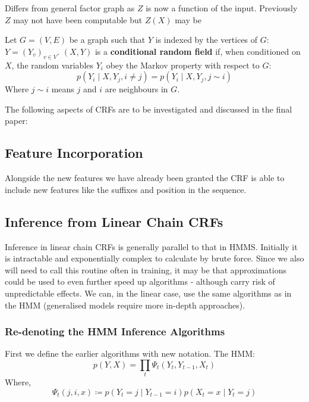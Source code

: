 \documentclass[../main.tex]{subfiles}
\begin{document}
Differs from general factor graph as $Z$ is now a function of the input. Previously $Z$ may not have been computable but $Z(X)$ may be

\begin{definition}
    Let $G = (V,E)$ be a graph such that $Y$ is indexed by the vertices of $G$: $Y = (Y_v)_{v \in V}$. $(X,Y)$ is a \textbf{conditional random field} if, when conditioned on $X$, the random variables $Y_i$ obey the Markov property with respect to $G$:
    \begin{equation*}
        p(Y_i \mid X, Y_j, i \neq j) = p(Y_i \mid X, Y_j, j \sim i)
    \end{equation*}
    Where $j \sim i$ means $j$ and $i$ are neighbours in $G$.
\end{definition}

The following aspects of CRFs are to be investigated and discussed in the final paper:

\subsection{Feature Incorporation}

Alongside the new features we have already been granted the CRF is able to include new features like the suffixes and position in the sequence.

\subsection{Inference from Linear Chain CRFs}

Inference in linear chain CRFs is generally parallel to that in HMMS.
Initially it is intractable and exponentially complex to calculate by brute force.
Since we also will need to call this routine often in training, it may be that approximations could be used to even further speed up algorithms - although carry risk of unpredictable effects.
We can, in the linear case, use the same algorithms as in the HMM (generalised models require more in-depth approaches).

\subsubsection{Re-denoting the HMM Inference Algorithms}
First we define the earlier algorithms with new notation.
The HMM:
\begin{equation*}
    p (Y,X) = \prod_t \Psi_t (Y_t, Y_{t-1}, X_t)
\end{equation*}
Where,
\begin{equation*}
    \Psi_t(j,i,x) \coloneqq p (Y_t=j \mid Y_{t-1}=i) p (X_t=x \mid Y_t=j)
\end{equation*}
\end{document}
